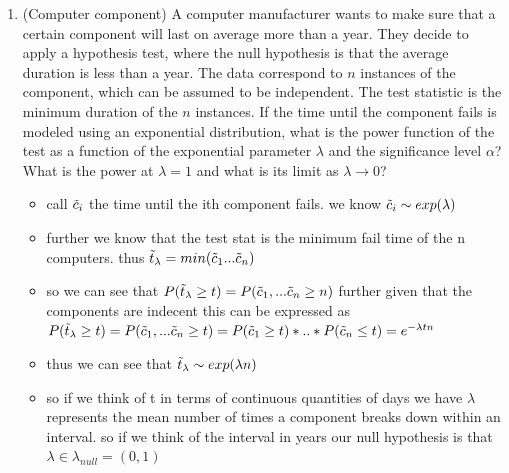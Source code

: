 \documentclass[12pt,twoside]{article}
\begin{document}
\begin{enumerate}
\item (Computer component) A computer manufacturer wants to make sure that a certain component will last on average more than a year. They decide to apply a hypothesis test, where the null hypothesis is that the average duration is less than a year. The data correspond to $n$ instances of the component, which can be assumed to be independent. The test statistic is the minimum duration of the $n$ instances. If the time until the component fails is modeled using an exponential distribution, what is the power function of the test as a function of the exponential parameter $\lambda$ and the significance level $\alpha$? What is the power at $\lambda = 1$ and what is its limit as $\lambda \rightarrow 0$?
\begin{itemize}
    \color{blue}
    \item call $\Tilde{c}_i$ the time until the ith component fails. we know $\Tilde{c}_i\sim exp(\lambda)$
    \item further we know that the test stat is the minimum fail time of the n computers. thus $\Tilde{t}_{\lambda}=min(\Tilde{c}_1...\Tilde{c}_n)$
    \item so we can see that $P(\Tilde{t}_{\lambda}\geq t)=P(\Tilde{c}_1,...\Tilde{c}_n\geq n)$ further given that the components are indecent this can be expressed as $P(\Tilde{t}_{\lambda}\geq t)=P(\Tilde{c}_1,...\Tilde{c}_n\geq t)=P(\Tilde{c}_1\geq t)*..*P(\Tilde{c}_{n}\leq t)=e^{-\lambda t n}$
\item thus we can see that $\Tilde{t}_{\lambda}\sim exp(\lambda n)$
\item so if we think of t in terms of continuous quantities of days we have $\lambda$ represents the mean number of times a component breaks down within an interval. so if we think of the interval in years our null hypothesis is that $\lambda \in \lambda_{null}=(0,1)$


\end{itemize}
\end{enumerate}
\end{document}
